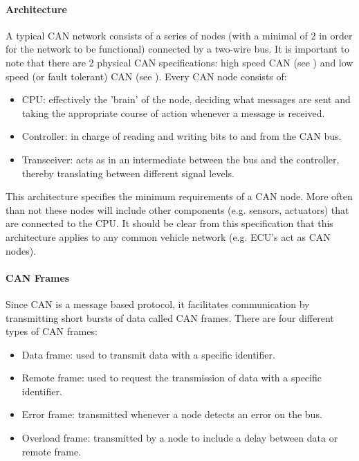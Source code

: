 \documentclass[master=cws,masteroption=vs,english]{kulemt}
\begin{document}
\paragraph{Architecture}

A typical CAN network consists of a series of nodes (with a minimal of 2 in order for the network to be functional) connected by a two-wire bus. It is important to note that there are 2 physical CAN specifications: high speed CAN (see \cite{ISO11898-2}) and low speed (or fault tolerant) CAN (see \cite{ISO11898-3}). Every CAN node consists of:
\begin{itemize}
	\item CPU: effectively the 'brain' of the node, deciding what messages are sent and taking the appropriate course of action whenever a message is received.
	\item Controller: in charge of reading and writing bits to and from the CAN bus.
	\item Transceiver: acts as in an intermediate between the bus and the controller, thereby translating between different signal levels.
\end{itemize}

This architecture specifies the minimum requirements of a CAN node. More often than not these nodes will include other components (e.g. sensors, actuators) that are connected to the CPU. It should be clear from this specification that this architecture applies to any common vehicle network (e.g. ECU's act as CAN nodes).

\paragraph{CAN Frames}

Since CAN is a message based protocol, it facilitates communication by transmitting short bursts of data called CAN frames. There are four different types of CAN frames:
\begin{itemize}
	\item Data frame: used to transmit data with a specific identifier.
	\item Remote frame: used to request the transmission of data with a specific identifier.
	\item Error frame: transmitted whenever a node detects an error on the bus.
	\item Overload frame: transmitted by a node to include a delay between data or remote frame.
\end{itemize}
\end{document}
